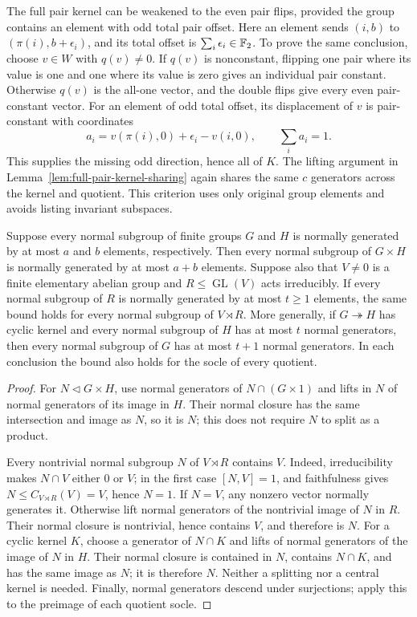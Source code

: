 The full pair kernel can be weakened to the even pair flips, provided
the group contains an element with odd total pair offset. Here an element
sends $(i,b)$ to $(\pi(i),b+\epsilon_i)$, and its total offset is
$\sum_i\epsilon_i\in\mathbb F_2$. To prove the same conclusion, choose
$v\in W$ with $q(v)\ne0$. If $q(v)$ is nonconstant, flipping one pair
where its value is one and one where its value is zero gives an individual
pair constant. Otherwise $q(v)$ is the all-one vector, and the double
flips give every even pair-constant vector. For an element of odd total
offset, its displacement of $v$ is pair-constant with coordinates
\[
 a_i=v(\pi(i),0)+\epsilon_i-v(i,0),\qquad \sum_i a_i=1.
\]
This supplies the missing odd direction, hence all of $K$. The lifting
argument in Lemma~\ref{lem:full-pair-kernel-sharing} again shares the
same $c$ generators across the kernel and quotient. This criterion uses
only original group elements and avoids listing invariant subspaces.

\begin{lemma}
\label{lem:product-affine-normal-generators}
Suppose every normal subgroup of finite groups $G$ and $H$ is normally
generated by at most $a$ and $b$ elements, respectively. Then every normal
subgroup of $G\times H$ is normally generated by at most $a+b$ elements.
Suppose also that $V\ne0$ is a finite elementary abelian group and
$R\leq\operatorname{GL}(V)$ acts irreducibly. If every normal subgroup
of $R$ is normally generated by at most $t\geq1$ elements, the same bound
holds for every normal subgroup of $V\rtimes R$.
More generally, if $G\twoheadrightarrow H$ has cyclic kernel and every
normal subgroup of $H$ has at most $t$ normal generators, then every
normal subgroup of $G$ has at most $t+1$ normal generators.
In each conclusion the bound also holds for the socle of every quotient.
\end{lemma}
\begin{proof}
For $N\lhd G\times H$, use normal generators of
$N\cap(G\times1)$ and lifts in $N$ of normal generators of its image
in $H$. Their normal closure has the same intersection and image as $N$,
so it is $N$; this does not require $N$ to split as a product.

Every nontrivial normal subgroup $N$ of $V\rtimes R$ contains $V$.
Indeed, irreducibility makes $N\cap V$ either $0$ or $V$; in the first
case $[N,V]=1$, and faithfulness gives $N\leq C_{V\rtimes R}(V)=V$,
hence $N=1$. If $N=V$, any nonzero vector normally generates it.
Otherwise lift normal generators of the nontrivial image of $N$ in $R$.
Their normal closure is nontrivial, hence contains $V$, and therefore is $N$.
For a cyclic kernel $K$, choose a generator of $N\cap K$ and lifts of
normal generators of the image of $N$ in $H$. Their normal closure is
contained in $N$, contains $N\cap K$, and has the same image as $N$;
it is therefore $N$. Neither a splitting nor a central kernel is needed.
Finally, normal generators descend under surjections; apply this to the
preimage of each quotient socle.
\end{proof}

